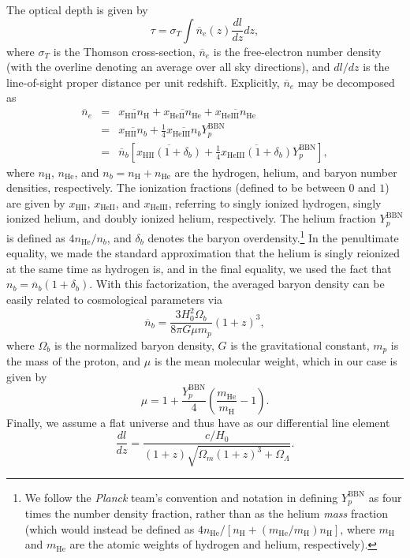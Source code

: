 \documentclass[twocolumn,aps,prd,nofootinbib,showpacs]{revtex4-1}
\begin{document}
The optical depth is given by
\begin{equation}
\tau = \sigma_T \int    \overline{n}_e (z)  \frac{dl}{dz} dz,
\end{equation}
where $\sigma_T$ is the Thomson cross-section, $\overline{n}_e$ is the free-electron number density (with the overline denoting an average over all sky directions), and $dl/dz$ is the line-of-sight proper distance per unit redshift. Explicitly, $\overline{n}_e$ may be decomposed as
\begin{eqnarray}
\overline{n}_e &=& \overline{x_\textrm{HII} n_\textrm{H}} + \overline{x_\textrm{HeII} n_\textrm{He}} + \overline{x_\textrm{HeIII} n_\textrm{He}} \nonumber \\
&=& \overline{x_\textrm{HII} n_b} + \frac{1}{4}\overline{x_\textrm{HeIII} n_b}Y_p^\textrm{BBN} \nonumber \\
&=& \overline{n}_b \left[  \overline{x_\textrm{HII} (1+\delta_b)} + \frac{1}{4}\overline{x_\textrm{HeIII} (1+\delta_b)} Y_p^\textrm{BBN} \right],
\end{eqnarray}
where $n_\textrm{H}$, $n_\textrm{He}$, and $n_b = n_\textrm{H} + n_\textrm{He}$ are the hydrogen, helium, and baryon number densities, respectively. The ionization fractions (defined to be between $0$ and $1$) are given by $x_\textrm{HII}$, $x_\textrm{HeII}$, and $x_\textrm{HeIII}$, referring to singly ionized hydrogen, singly ionized helium, and doubly ionized helium, respectively. The helium fraction $Y_p^\textrm{BBN}$ is defined as $4n_\textrm{He} / n_b$, and $\delta_b$ denotes the baryon overdensity.\footnote{We follow the \emph{Planck} team's convention and notation in defining $Y_p^\textrm{BBN}$ as four times the number density fraction, rather than as the helium \emph{mass} fraction (which would instead be defined as $4n_\textrm{He} / [n_\textrm{H} + (m_\textrm{He} / m_\textrm{H}) n_\textrm{H} ]$, where $m_\textrm{H}$ and $m_\textrm{He}$ are the atomic weights of hydrogen and helium, respectively).} In the penultimate equality, we made the standard approximation that the helium is singly reionized at the same time as hydrogen is, and in the final equality, we used the fact that $n_b =\overline{n}_b ( 1+ \delta_b)$. With this factorization, the averaged baryon density can be easily related to cosmological parameters via
\begin{equation}
\overline{n}_b = \frac{3 H_0^2 \Omega_b}{8 \pi G \mu m_p} (1+z)^3,
\end{equation}
where $\Omega_b$ is the normalized baryon density, $G$ is the gravitational constant, $m_p$ is the mass of the proton, and $\mu$ is the mean molecular weight, which in our case is given by
\begin{equation}
\mu = 1 + \frac{Y_p^\textrm{BBN}}{4} \left( \frac{m_\textrm{He}}{m_\textrm{H}} - 1\right).
\end{equation}
Finally, we assume a flat universe and thus have as our differential line element
\begin{equation}
\frac{dl}{dz} =  \frac{c/H_0}{(1+z) \sqrt{\Omega_m (1+z)^3 + \Omega_\Lambda}}.
\end{equation}
\end{document}
